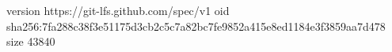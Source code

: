 version https://git-lfs.github.com/spec/v1
oid sha256:7fa288c38f3e51175d3cb2c5c7a82bc7fe9852a415e8ed1184e3f3859aa7d478
size 43840
